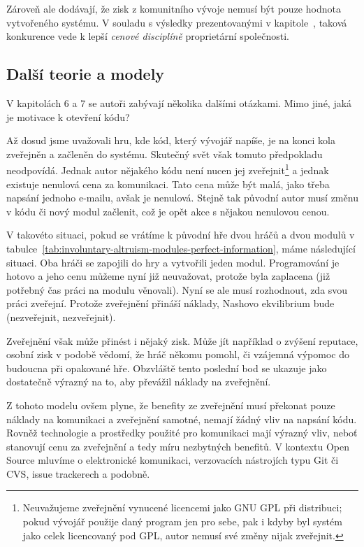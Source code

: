\begin{multicols}{2}
		Zároveň ale dodávají, že zisk z komunitního vývoje nemusí být pouze hodnota vytvořeného systému. V souladu s výsledky prezentovanými v kapitole~, taková konkurence vede k lepší {\em cenové disciplíně} proprietární společnosti.

	\subsection*{Další teorie a modely}
		V kapitolách 6 a 7 se autoři zabývají několika dalšími otázkami. Mimo jiné, jaká je motivace k otevření kódu?

		Až dosud jsme uvažovali hru, kde kód, který vývojář napíše, je na konci kola zveřejněn a začleněn do systému. Skutečný svět však tomuto předpokladu neodpovídá. Jednak autor nějakého kódu není nucen jej zveřejnit\footnote{Neuvažujeme zveřejnění vynucené licencemi jako GNU GPL při distribuci; pokud vývojář použije daný program jen pro sebe, pak i kdyby byl systém jako celek licencovaný pod GPL, autor nemusí své změny nijak zveřejnit.} a jednak existuje nenulová cena za komunikaci. Tato cena může být malá, jako třeba napsání jednoho e-mailu, avšak je nenulová. Stejně tak původní autor musí změnu v kódu či nový modul začlenit, což je opět akce s nějakou nenulovou cenou.

		V takovéto situaci, pokud se vrátíme k původní hře dvou hráčů a dvou modulů v tabulce~\ref{tab:involuntary-altruism-modules-perfect-information}, máme následující situaci. Oba hráči se zapojili do hry a vytvořili jeden modul. Programování je hotovo a jeho cenu můžeme nyní již neuvažovat, protože byla zaplacena (již potřebný čas práci na modulu věnovali). Nyní se ale musí rozhodnout, zda svou práci zveřejní. Protože zveřejnění přináší náklady, Nashovo ekvilibrium bude (nezveřejnit, nezveřejnit).

		Zveřejnění však může přinést i nějaký zisk. Může jít například o zvýšení reputace, osobní zisk v podobě vědomí, že hráč někomu pomohl, či vzájemná výpomoc do budoucna při opakované hře. Obzvláště tento poslední bod se ukazuje jako dostatečně výrazný na to, aby převážil náklady na zveřejnění.

		Z tohoto modelu ovšem plyne, že benefity ze zveřejnění musí překonat pouze náklady na komunikaci a zveřejnění samotné, nemají žádný vliv na napsání kódu. Rovněž technologie a prostředky použité pro komunikaci mají výrazný vliv, neboť stanovují cenu za zveřejnění a tedy míru nezbytných benefitů. V kontextu Open Source mluvíme o elektronické komunikaci,  verzovacích nástrojích typu Git či CVS, issue trackerech a podobně.


\end{multicols}
